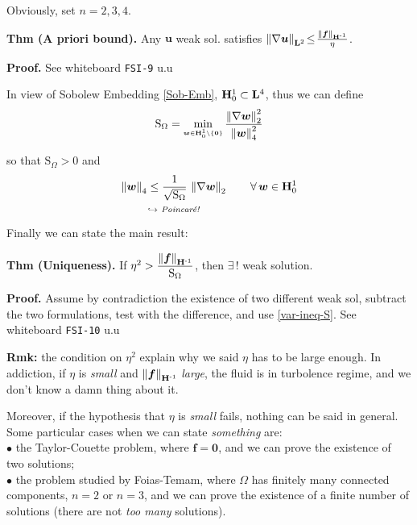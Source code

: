 
Obviously, set $n=2,3,4$.

\textbf{Thm (A priori bound).} Any $\bm u$ weak sol. satisfies $\left\lVert \nabla\bm u \right\rVert_{\mathbf{L}^2}\!\leq\! \frac{\left\lVert \bm f \right\rVert_{\mathbf{H}^{\text{-}1}}}{\eta}$.

\textbf{\color{lavender(floral)}Proof.} See whiteboard \texttt{FSI-9} u.u

\smallskip

In view of Sobolew Embedding \eqref{Sob-Emb}, $\mathbf{H}_0^1\subset\mathbf{L}^4$, thus we can define
\begin{equation*}
\mathrm{S}_{\Omega}=\min_{\scriptscriptstyle\bm w \in \mathbf{H}_0^1\setminus \{\bm 0\} } \frac{\left\lVert \nabla\bm w \right\rVert_2^2}{\left\lVert \bm w \right\rVert_4^2} 
\end{equation*} 

so that $\mathrm{S}_{\Omega}>0$ and 
\begin{equation}
\label{var-ineq-S}
\underbracket[0pt]{\norm{\bm w}_4\leq \frac{1}{\sqrt{\mathrm{S}_{\Omega}}}\, \norm{\nabla \bm w}_2}_{\hookrightarrow\textit{ Poincaré!}}\qquad \forall\,\bm w \in \Hv^1_0
\end{equation}

Finally we can state the main result:

\smallskip

\textbf{Thm (Uniqueness).} If $\eta^2>\dfrac{\left\lVert \bm f \right\rVert_{\mathbf{H}^{\text{-}1}}}{\mathrm{S}_{\Omega}}$, then $\exists\,!$ weak solution.

\smallskip

\textbf{\color{lavender(floral)}Proof.} Assume by contradiction the existence of two different weak sol, subtract the two formulations, test with the difference, and use \eqref{var-ineq-S}. See whiteboard \texttt{FSI-10} u.u

\smallskip

{\color{forestgreen(web)} \textbf{Rmk:} the condition on $\eta^2$ explain why we said $\eta$ has to be large enough. In addiction, if $\eta$ is \emph{small} and $\left\lVert \bm f \right\rVert_{\mathbf{H}^{\text{-}1}}$ \emph{large}, the fluid is in turbolence regime, and we don't know a damn thing about it.}

\smallskip

Moreover, if the hypothesis that $\eta$ is \emph{small} fails, nothing can be said in general. Some particular cases when we can state \emph{something} are: \\
$\bullet$ the Taylor-Couette problem, where $\bm f=\bm 0$, and we can prove the existence of two solutions; \\
$\bullet$ the problem studied by Foias-Temam, where $\Omega$ has finitely many connected components, $n=2$ or $n=3$, and we can prove the existence of a finite number of solutions (there are not \emph{too many} solutions).

